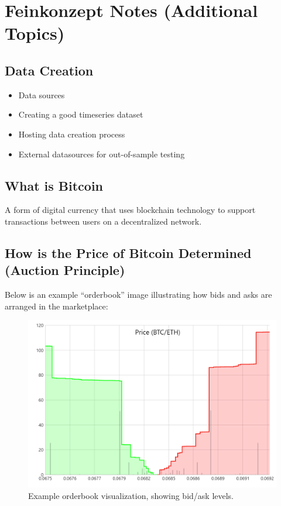 \documentclass[9pt,a4paper,twocolumn,twoside]{tau-class/tau}
\begin{document}
\section{Feinkonzept Notes (Additional Topics)}

\subsection{Data Creation}
\begin{itemize}
  \item Data sources
  \item Creating a good timeseries dataset
  \item Hosting data creation process
  \item External datasources for out-of-sample testing
\end{itemize}


\subsection{What is Bitcoin}
A form of digital currency that uses blockchain technology to support transactions between users on a decentralized network.

\subsection{How is the Price of Bitcoin Determined (Auction Principle)}

Below is an example “orderbook” image illustrating how bids and asks are 
arranged in the marketplace:

\begin{figure}[H]
    \centering
    \includegraphics[width=0.85\columnwidth]{figures/orderbook.png}
    \caption{Example orderbook visualization, showing bid/ask levels.}
    \label{fig:orderbook}
\end{figure}
\end{document}
